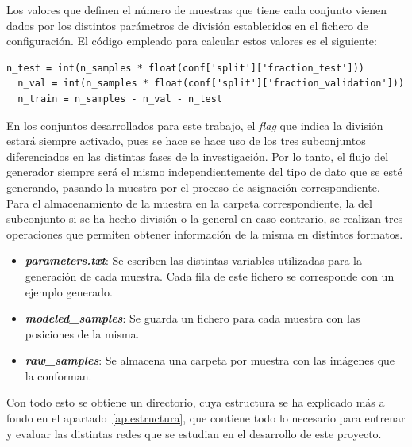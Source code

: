 Los valores que definen el número de muestras que tiene cada conjunto vienen dados por los distintos parámetros de división establecidos en el fichero de configuración. El código empleado para calcular estos valores es el siguiente:
\vspace{10pt}
\begin{lstlisting}[frame=single]
  n_test = int(n_samples * float(conf['split']['fraction_test']))
  n_val = int(n_samples * float(conf['split']['fraction_validation']))
  n_train = n_samples - n_val - n_test
\end{lstlisting}

En los conjuntos desarrollados para este trabajo, el \textit{flag} que indica la división estará siempre activado, pues se hace se hace uso de los tres subconjuntos diferenciados en las distintas fases de la investigación. Por lo tanto, el flujo del generador siempre será el mismo independientemente del tipo de dato que se esté generando, pasando la muestra por el proceso de asignación correspondiente.\\

Para el almacenamiento de la muestra en la carpeta correspondiente, la del subconjunto si se ha hecho división o la general en caso contrario, se realizan tres operaciones que permiten obtener información de la misma en distintos formatos.

\begin{itemize}
    \setlength\itemsep{3pt}
    \item \textbf{\textit{parameters.txt}}: Se escriben las distintas variables utilizadas para la generación de cada muestra. Cada fila de este fichero se corresponde con un ejemplo generado.
    \item \textbf{\textit{modeled}\_\textit{samples}}: Se guarda un fichero para cada muestra con las posiciones de la misma.
    \item \textbf{\textit{raw}\_\textit{samples}}: Se almacena una carpeta por muestra con las imágenes que la conforman.
\end{itemize}

Con todo esto se obtiene un directorio, cuya estructura se ha explicado más a fondo en el apartado~\ref{ap.estructura}, que contiene todo lo necesario para entrenar y evaluar las distintas redes que se estudian en el desarrollo de este proyecto.